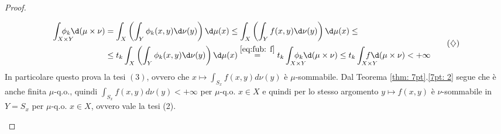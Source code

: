 \begin{proof}
\begin{itemize}
        \[\begin{aligned}
            \int_{X\times Y}\!\!\!\!\!\!\!\!\!\!\phi_k\d(\mu\times \nu) &= \int_X\left(\int_Y\phi_k(x,y)\d\nu(y)\right)\d\mu(x) \leq \int_X\left(\int_Yf(x,y)\d\nu(y)\right)\d\mu(x)\leq \\&\leq t_k\int_X\left(\int_Y\phi_k(x,y)\d\nu(y)\right)\d\mu(x)  \overset{\eqref{eq:fub: f}}= t_k\int_{X\times Y}\!\!\!\!\!\!\!\!\!\!\phi_k\d(\mu\times \nu)\leq t_k\int_{X\times Y}\!\!\!\!\!\!\!\!\!\!f\d(\mu\times \nu)<+\infty
        \end{aligned}\tag{$\diamondsuit$}\label{eq:fub: quadri}\]
        In particolare questo prova la tesi $(3)$, ovvero che $x \mapsto \int_{S_{x}} f(x, y) d \nu(y)$ è $\mu$-sommabile. Dal Teorema \ref{thm: 7pt}.\ref{7pt: 2} segue che è anche finita $\mu$-q.o., quindi $\int_{S_{x}} f(x, y) d \nu(y)<+\infty$ per $\mu$-q.o. $x\in X$ e quindi per lo stesso argomento $y\mapsto f(x,y)$ è $\nu$-sommabile in $Y=S_x$ per $\mu$-q.o. $x\in X$, ovvero vale la tesi (2).


\end{itemize}
\end{proof}
